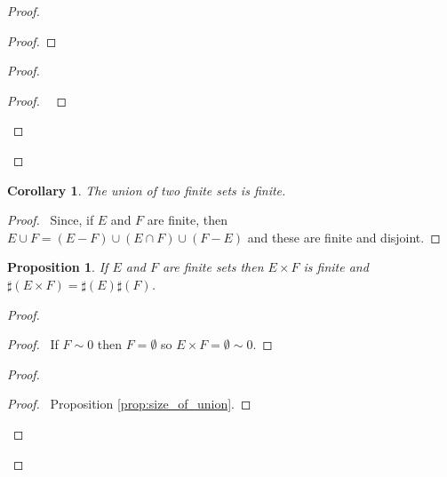 \documentclass{report}
\let\qed\relax
\newtheorem{prop}[ax]{Proposition}
\newtheorem{cor}{Corollary}[ax]
\theoremstyle{definition}
\begin{document}
\begin{proof}
\pf
{}
\begin{proof}
\end{proof}
\begin{proof}
	\begin{proof}
		\pf\ 
	\end{proof}
\end{proof}
\qed
\end{proof}

\begin{cor}
\label{cor:union_finite}
The union of two finite sets is finite.
\end{cor}

\begin{proof}
\pf\ Since, if $E$ and $F$ are finite, then $E \cup F = (E - F) \cup (E \cap F) \cup (F - E)$ and these are finite and disjoint. \qed
\end{proof}

\begin{prop}
\label{prop:size_product}
If $E$ and $F$ are finite sets then $E \times F$ is finite and $\sharp(E \times F) = \sharp(E) \sharp(F)$.
\end{prop}

\begin{proof}
\pf
{}
\begin{proof}
	\pf\ If $F \sim 0$ then $F = \emptyset$ so $E \times F = \emptyset \sim 0$.
\end{proof}
\begin{proof}
	\begin{proof}
		\pf\ Proposition \ref{prop:size_of_union}.
	\end{proof}
\end{proof}
\qed
\end{proof}
\end{document}
